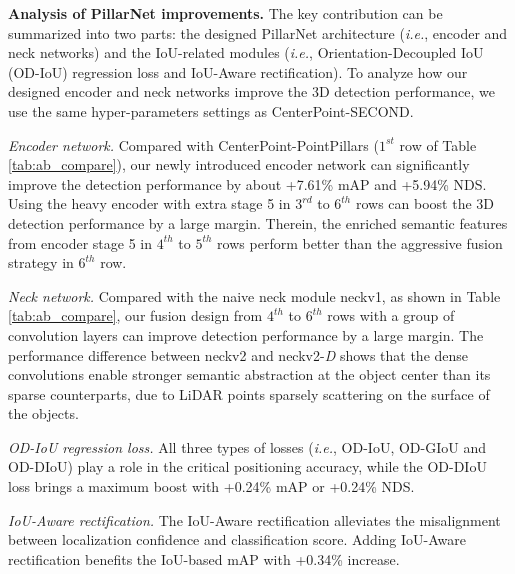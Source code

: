 \documentclass[runningheads]{llncs}
\begin{document}
{\flushleft \bf Analysis of PillarNet improvements.}
The key contribution can be summarized into two parts: the designed PillarNet architecture (\textit{i.e.}, encoder and neck networks) and the IoU-related modules (\textit{i.e.}, Orientation-Decoupled IoU (OD-IoU) regression loss and IoU-Aware rectification).
To analyze how our designed encoder and neck networks improve the 3D detection performance, we use the same hyper-parameters settings as CenterPoint-SECOND.


\textit{Encoder network.}
Compared with CenterPoint-PointPillars \cite{lang2019pointpillars} ($1^{st}$ row of Table \ref{tab:ab_compare}), our newly introduced encoder network can significantly improve the detection performance by about +7.61\% mAP and +5.94\% NDS.
Using the heavy encoder with extra stage 5 in $3^{rd}$ to $6^{th}$ rows can boost the 3D detection performance by a large margin.
Therein, the enriched semantic features from encoder stage 5 in $4^{th}$ to $5^{th}$ rows perform better than the aggressive fusion strategy in $6^{th}$ row.

\textit{Neck network.}
Compared with the naive neck module neckv1, as shown in Table \ref{tab:ab_compare}, our fusion design from $4^{th}$ to $6^{th}$ rows with a group of convolution layers can improve detection performance by a large margin.
The performance difference between neckv2 and neckv2-\textit{D} shows that the dense convolutions enable stronger semantic abstraction at the object center than its sparse counterparts, due to LiDAR points sparsely scattering on the surface of the objects. 

\textit{OD-IoU regression loss.}
All three types of losses (\textit{i.e.}, OD-IoU, OD-GIoU and OD-DIoU) play a role in the critical positioning accuracy, while the OD-DIoU loss brings a maximum boost with +0.24\% mAP or +0.24\% NDS. 

\textit{IoU-Aware rectification.} The IoU-Aware rectification  alleviates the misalignment between localization confidence and classification score. 
Adding IoU-Aware rectification benefits the IoU-based mAP with +0.34\% increase.
\end{document}
